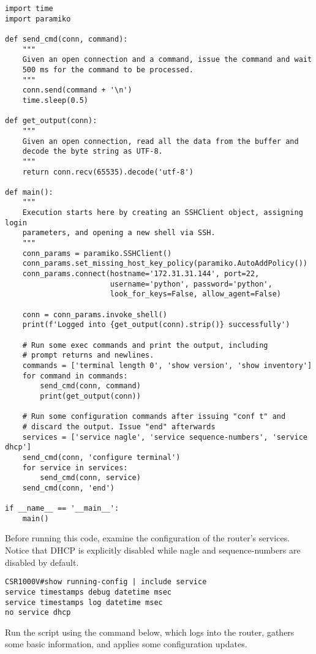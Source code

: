 \begin{verbatim}
import time
import paramiko

def send_cmd(conn, command):
    """
    Given an open connection and a command, issue the command and wait
    500 ms for the command to be processed.
    """
    conn.send(command + '\n')
    time.sleep(0.5)

def get_output(conn):
    """
    Given an open connection, read all the data from the buffer and
    decode the byte string as UTF-8.
    """
    return conn.recv(65535).decode('utf-8')

def main():
    """
    Execution starts here by creating an SSHClient object, assigning login
    parameters, and opening a new shell via SSH.
    """
    conn_params = paramiko.SSHClient()
    conn_params.set_missing_host_key_policy(paramiko.AutoAddPolicy())
    conn_params.connect(hostname='172.31.31.144', port=22,
                        username='python', password='python',
                        look_for_keys=False, allow_agent=False)

    conn = conn_params.invoke_shell()
    print(f'Logged into {get_output(conn).strip()} successfully')

    # Run some exec commands and print the output, including
    # prompt returns and newlines.
    commands = ['terminal length 0', 'show version', 'show inventory']
    for command in commands:
        send_cmd(conn, command)
        print(get_output(conn))

    # Run some configuration commands after issuing "conf t" and
    # discard the output. Issue "end" afterwards
    services = ['service nagle', 'service sequence-numbers', 'service dhcp']
    send_cmd(conn, 'configure terminal')
    for service in services:
        send_cmd(conn, service)
    send_cmd(conn, 'end')

if __name__ == '__main__':
    main()
\end{verbatim}

Before running this code, examine the configuration of the router's services.
Notice that DHCP is explicitly disabled while nagle and sequence-numbers are
disabled by default.

\begin{verbatim}
CSR1000V#show running-config | include service
service timestamps debug datetime msec
service timestamps log datetime msec
no service dhcp
\end{verbatim}

Run the script using the command below, which logs into the router, gathers
some basic information, and applies some configuration updates.

